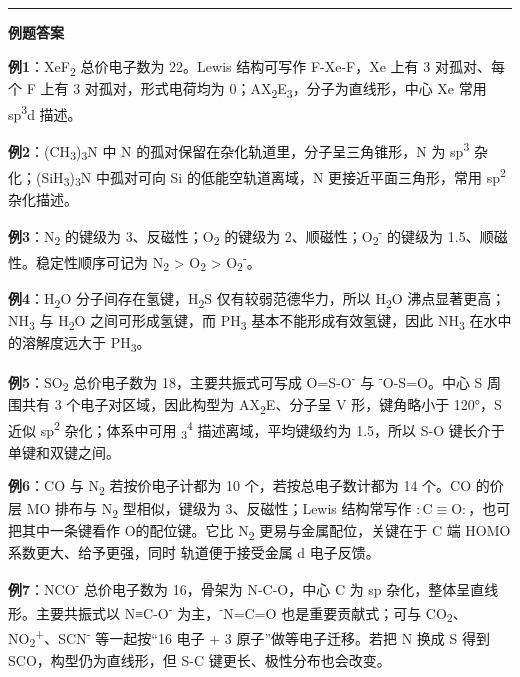 \begin{center}\rule{0.5\linewidth}{0.5pt}\end{center}

\textbf{例题答案}

\textbf{例1}：XeF\textsubscript{2} 总价电子数为 22。Lewis 结构可写作 F-Xe-F，Xe 上有 3 对孤对、每个 F 上有 3 对孤对，形式电荷均为 0；AX\textsubscript{2}E\textsubscript{3}，分子为直线形，中心 Xe 常用 sp\textsuperscript{3}d 描述。

\textbf{例2}：(CH\textsubscript{3})\textsubscript{3}N 中 N 的孤对保留在杂化轨道里，分子呈三角锥形，N 为 sp\textsuperscript{3} 杂化；(SiH\textsubscript{3})\textsubscript{3}N 中孤对可向 Si 的低能空轨道离域，N 更接近平面三角形，常用 sp\textsuperscript{2} 杂化描述。

\textbf{例3}：N\textsubscript{2} 的键级为 3、反磁性；O\textsubscript{2} 的键级为 2、顺磁性；O\textsubscript{2}\textsuperscript{-} 的键级为 1.5、顺磁性。稳定性顺序可记为 N\textsubscript{2} \textgreater{} O\textsubscript{2} \textgreater{} O\textsubscript{2}\textsuperscript{-}。

\textbf{例4}：H\textsubscript{2}O 分子间存在氢键，H\textsubscript{2}S 仅有较弱范德华力，所以 H\textsubscript{2}O 沸点显著更高；NH\textsubscript{3} 与 H\textsubscript{2}O 之间可形成氢键，而 PH\textsubscript{3} 基本不能形成有效氢键，因此 NH\textsubscript{3} 在水中的溶解度远大于 PH\textsubscript{3}。

\textbf{例5}：SO\textsubscript{2} 总价电子数为 18，主要共振式可写成 O=S-O\textsuperscript{-} 与 \textsuperscript{-}O-S=O。中心 S 周围共有 3 个电子对区域，因此构型为 AX\textsubscript{2}E、分子呈 V 形，键角略小于 120°，S 近似 sp\textsuperscript{2} 杂化；体系中可用 \派\textsubscript{3}\textsuperscript{4} 描述离域，平均键级约为 1.5，所以 S-O 键长介于单键和双键之间。

\textbf{例6}：CO 与 N\textsubscript{2} 若按价电子计都为 10 个，若按总电子数计都为 14 个。CO 的价层 MO 排布与 N\textsubscript{2} 型相似，键级为 3、反磁性；Lewis 结构常写作 \(\mathrm{:C\equiv O:}\)，也可把其中一条键看作 O 的配位键。它比 N\textsubscript{2} 更易与金属配位，关键在于 C 端 HOMO 系数更大、 给予更强，同时 \派* 轨道便于接受金属 d 电子反馈。

\textbf{例7}：NCO\textsuperscript{-} 总价电子数为 16，骨架为 N-C-O，中心 C 为 sp 杂化，整体呈直线形。主要共振式以 N≡C-O\textsuperscript{-} 为主，\textsuperscript{-}N=C=O 也是重要贡献式；可与 CO\textsubscript{2}、NO\textsubscript{2}\textsuperscript{+}、SCN\textsuperscript{-} 等一起按``16 电子 + 3 原子''做等电子迁移。若把 N 换成 S 得到 SCO，构型仍为直线形，但 S-C 键更长、极性分布也会改变。

